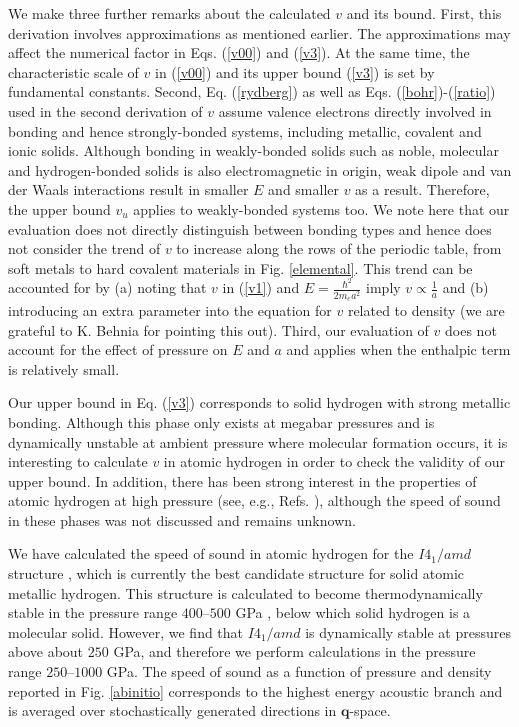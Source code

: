 \documentclass[aps,prl,groupedaddress,fleqn,twocolumn,10pt]{revtex4}
\begin{document}
We make three further remarks about the calculated $v$ and its bound. First, this derivation involves approximations as mentioned earlier. The approximations may affect the numerical factor in Eqs. (\ref{v00}) and (\ref{v3}). At the same time, the characteristic scale of $v$ in (\ref{v00}) and its upper bound (\ref{v3}) is set by fundamental constants. Second, Eq. (\ref{rydberg}) as well as Eqs. (\ref{bohr})-(\ref{ratio}) used in the second derivation of $v$ assume valence electrons directly involved in bonding and hence strongly-bonded systems, including metallic, covalent and ionic solids. Although bonding in weakly-bonded solids such as noble, molecular and hydrogen-bonded solids is also electromagnetic in origin, weak dipole and van der Waals interactions result in smaller $E$ \cite{vadim1} and smaller $v$ as a result. Therefore, the upper bound $v_u$ applies to weakly-bonded systems too. We note here that our evaluation does not directly distinguish between bonding types and hence does not consider the trend of $v$ to increase along the rows of the periodic table, from soft metals to hard covalent materials in Fig. \ref{elemental}. This trend can be accounted for by (a) noting that $v$ in (\ref{v1}) and $E=\frac{\hbar^2}{2m_ea^2}$ imply $v\propto\frac{1}{a}$ and (b) introducing an extra parameter into the equation for $v$ related to density (we are grateful to K. Behnia for pointing this out). Third, our evaluation of $v$ does not account for the effect of pressure on $E$ and $a$ and applies when the enthalpic term is relatively small.


Our upper bound in Eq. (\ref{v3}) corresponds to solid hydrogen with strong metallic bonding. Although this phase only exists at megabar pressures \cite{silvera,loubeyre} and is dynamically unstable at ambient pressure where molecular formation occurs, it is interesting to calculate $v$ in atomic hydrogen in order to check the validity of our upper bound. In addition, there has been strong interest in the properties of atomic hydrogen at high pressure (see, e.g., Refs. \cite{silvera,loubeyre,hydrogen}), although the speed of sound in these phases was not discussed and remains unknown.

We have calculated the speed of sound in atomic hydrogen for the $I4_1/amd$ structure \cite{i41amd,pickard_h_natphys}, which is currently the best candidate structure for solid atomic metallic hydrogen. This structure is calculated to become thermodynamically stable in the pressure range $400$--$500$ GPa \cite{azadi_metal,morales_metal}, below which solid hydrogen is a molecular solid. However, we find that $I4_1/amd$ is dynamically stable at pressures above about $250$ GPa, and therefore we perform calculations in the pressure range $250$--$1000$ GPa. The speed of sound as a function of pressure and density reported in Fig. \ref{abinitio} corresponds to the highest energy acoustic branch and is averaged over stochastically generated directions in $\mathbf{q}$-space.
\end{document}
